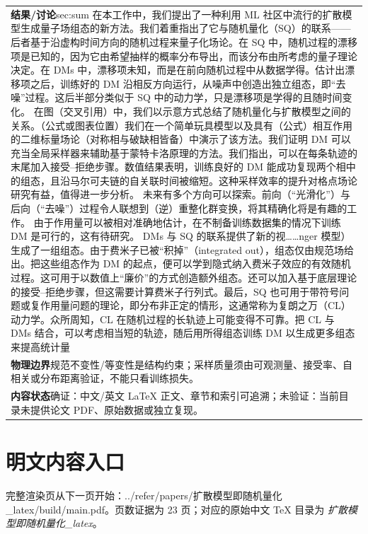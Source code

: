 \documentclass[UTF8,11pt,oneside]{ctexbook}
\begin{document}
\begin{table}[htbp]
\begin{tabular}{@{}p{}@{}}
    \textbf{结果/讨论}\quad sec:sum 在本工作中，我们提出了一种利用 ML 社区中流行的扩散模型生成量子场组态的新方法。我们着重指出了它与随机量化（SQ）的联系——后者基于沿虚构时间方向的随机过程来量子化场论。在 SQ 中，随机过程的漂移项是已知的，因为它由希望抽样的概率分布导出，而该分布由所考虑的量子理论决定。在 DMs 中，漂移项未知，而是在前向随机过程中从数据学得。估计出漂移项之后，训练好的 DM 沿相反方向运行，从噪声中创造出独立组态，即``去噪''过程。这后半部分类似于 SQ 中的动力学，只是漂移项是学得的且随时间变化。 在图（交叉引用）中，我们以示意方式总结了随机量化与扩散模型之间的关系。（公式或图表位置）我们在一个简单玩具模型以及具有（公式）相互作用的二维标量场论（对称相与破缺相皆备）中演示了该方法。我们证明 DM 可以充当全局采样器来辅助基于蒙特卡洛原理的方法。我们指出，可以在每条轨迹的末尾加入接受–拒绝步骤。数值结果表明，训练良好的 DM 能成功复现两个相中的组态，且沿马尔可夫链的自关联时间被缩短。这种采样效率的提升对格点场论研究有益，值得进一步分析。 未来有多个方向可以探索。前向（``光滑化''）与后向（``去噪''）过程令人联想到（逆）重整化群变换，将其精确化将是有趣的工作。 由于作用量可以被相对准确地估计，在不制备训练数据集的情况下训练 DM 是可行的，这有待研究。 DMs 与 SQ 的联系提供了新的视……nger 模型）生成了一组组态。由于费米子已被``积掉''（integrated out），组态仅由规范场给出。把这些组态作为 DM 的起点，便可以学到隐式纳入费米子效应的有效随机过程。这可用于以数值上``廉价''的方式创造额外组态。还可以加入基于底层理论的接受–拒绝步骤，但这需要计算费米子行列式。最后，SQ 也可用于带符号问题或复作用量问题的理论，即分布非正定的情形，这通常称为复朗之万（CL）动力学。众所周知，CL 在随机过程的长轨迹上可能变得不可靠。把 CL 与 DMs 结合，可以考虑相当短的轨迹，随后用所得组态训练 DM 以生成更多组态来提高统计量 \\
    \textbf{物理边界}\quad 规范不变性/等变性是结构约束；采样质量须由可观测量、接受率、自相关或分布距离验证，不能只看训练损失。 \\
    \textbf{内容状态}\quad 确证：中文/英文 LaTeX 正文、章节和索引可追溯；未验证：当前目录未提供论文 PDF、原始数据或独立复现。 \\
    \bottomrule
  \end{tabular}
\end{table}
\section*{明文内容入口}
\noindent 完整渲染页从下一页开始：../\allowbreak{}refer/\allowbreak{}papers/\allowbreak{}扩散模型即随机量化\_\allowbreak{}latex/\allowbreak{}build/\allowbreak{}main.pdf。页数证据为 23 页；对应的原始中文 TeX 目录为 \emph{扩散模型即随机量化\_latex}。
\clearpage

\clearpage
\end{document}
